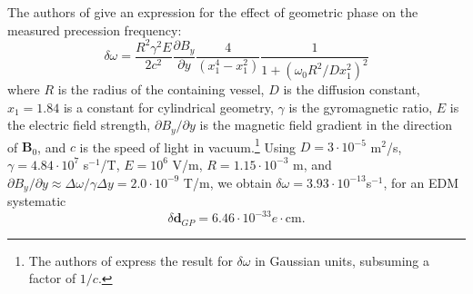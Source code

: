 \documentclass [10pt, twoside] {uwthesis}[2012/04/02]
\begin{document}
The authors of \cite{2005_Lamoreaux_and_Golub_nEDM_geometric_phase} give an expression for the effect of geometric phase on the measured precession frequency:
\begin{equation}
\label{GPsystematic}
\delta \omega = \dfrac{R^2\gamma^2E}{2 c^2}\dfrac{\partial B_y}{\partial y} \dfrac{4}{(x_1^4- x_1^2)} \dfrac{1}{1+(\omega_0 R^2/Dx_1^2)^2}
\end{equation}	
where $R$ is the radius of the containing vessel, $D$ is the diffusion constant, $x_1 = 1.84$ is a constant for cylindrical geometry, $\gamma$ is the gyromagnetic ratio, $E$ is the electric field strength, $\partial B_y / \partial y$ is the magnetic field gradient in the direction of $\mathbf{B}_0$, and $c$ is the speed of light in vacuum.\footnote{The authors of \cite{2005_Lamoreaux_and_Golub_nEDM_geometric_phase} express the result for $\delta \omega$ in Gaussian units, subsuming a factor of $1/c$.} Using $D = 3\cdot10^{-5}$ m$^2$/s, $\gamma = 4.84\cdot 10^7$ s$^{-1}$/T, $E = 10^6$ V/m, $R = 1.15 \cdot 10^{-3}$ m, and $\partial B_y / \partial y \approx \Delta \omega / \gamma \Delta y  = 2.0 \cdot 10^{-9}$ T/m, we obtain $\delta \omega = 3.93\cdot 10^{-13}$s$^{-1}$, for an EDM systematic  
\begin{equation}
\delta \mathbf{d}_{GP} = 6.46\cdot 10^{-33} e\cdot \text{cm}.
\end{equation} 
\end{document}
